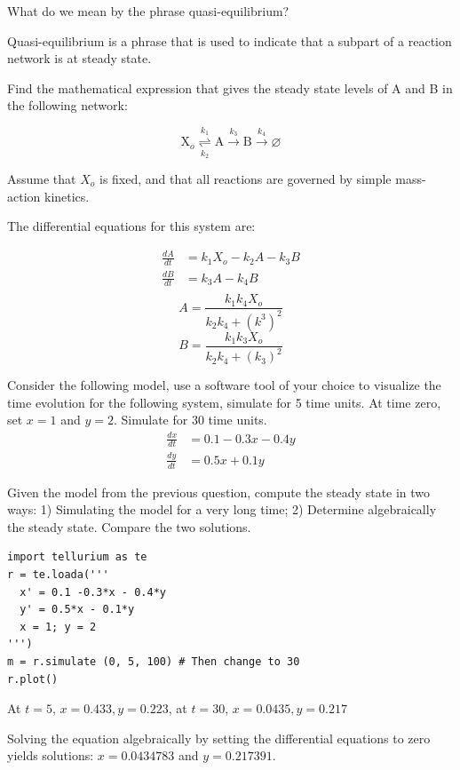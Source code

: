 \documentclass[12pt]{article}
\begin{document}
\begin{question}
What do we mean by the phrase quasi-equilibrium?
\end{question}
\begin{solution}
Quasi-equilibrium is a phrase that is used to indicate that a subpart of a reaction network is at steady state.
\end{solution}



\begin{question}
Find the mathematical expression that gives the steady state levels of A and B in the following network:

\begin{equation}
\text{X}_o \underset{k_2}{\overset{k_1}{\rightleftharpoons}}
 \text{A} \stackrel{k_3}{\rightarrow} \text{B} \stackrel{k_4}{\rightarrow} \varnothing
\label{model:exSS}
\end{equation}

Assume that $X_o$ is fixed, and that all reactions are governed by simple mass-action kinetics.
\end{question}
\begin{solution}
The differential equations for this system are:

\begin{align*}
\frac{dA}{dt} &= k_1 X_o - k_2 A - k_3 B\\[4pt]
\frac{dB}{dt} &= k_3 A - k_4 B \\
\end{align*}
%
$$ A = \frac{k_1 k_4 X_o}{k_2 k_4 + (k^3)^2} $$
%
$$ B = \frac{k_1 k_3 X_o}{k_2 k_4 + (k_3)^2} $$
\end{solution}




\begin{question}
Consider the following model, use a software tool of your choice to visualize the time evolution for the following system, simulate for 5 time units. At time zero, set $x = 1$ and $y = 2$. Simulate for 30 time units.
%
\begin{align*}
\frac{dx}{dt} &= 0.1 - 0.3 x - 0.4 y \\[5pt]
\frac{dy}{dt} &= 0.5 x + 0.1 y
\end{align*}

Given the model from the previous question, compute the steady state in two ways: 1) Simulating the model for a very long time; 2) Determine algebraically the steady state. Compare the two solutions.
\end{question}
\cprotEnv\begin{solution}
\begin{verbatim}
import tellurium as te
r = te.loada('''
  x' = 0.1 -0.3*x - 0.4*y
  y' = 0.5*x - 0.1*y
  x = 1; y = 2
''')
m = r.simulate (0, 5, 100) # Then change to 30
r.plot()
\end{verbatim}

At $t = 5$, $x = 0.433, y = 0.223$, at $t = 30$, $x = 0.0435, y = 0.217$

Solving the equation algebraically by setting the differential equations to zero yields solutions: $x = 0.0434783$ and $y = 0.217391$.
\end{solution}
\end{document}
